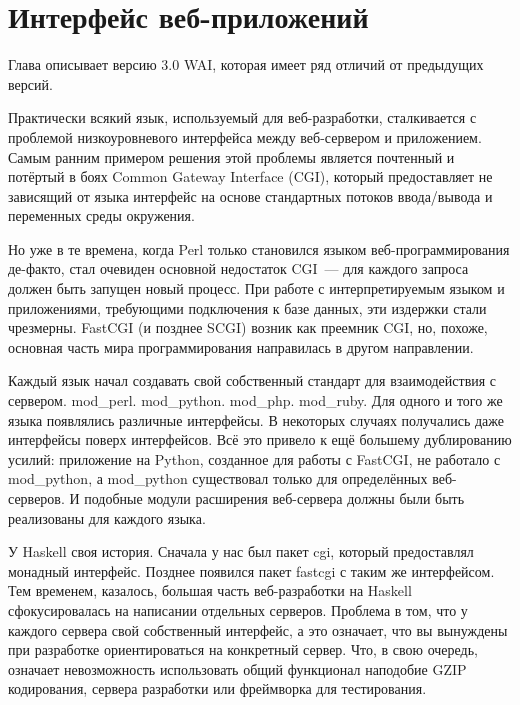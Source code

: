 \chapter{Интерфейс веб-приложений}\label{chap:web_application_interface}

\begin{remark}
    Глава описывает версию 3.0 WAI, которая имеет ряд отличий от предыдущих
    версий.
\end{remark}

Практически всякий язык, используемый для веб-разработки, сталкивается с
проблемой низкоуровневого интерфейса между веб-сервером и приложением. Самым
ранним примером решения этой проблемы является почтенный и потёртый в боях
Common Gateway Interface (CGI), который предоставляет не зависящий от языка
интерфейс на основе стандартных потоков ввода/вывода и переменных среды
окружения.

Но уже в те времена, когда Perl только становился языком веб-программирования
де-факто, стал очевиден основной недостаток CGI~--- для каждого запроса должен
быть запущен новый процесс. При работе с интерпретируемым языком и
приложениями, требующими подключения к базе данных, эти издержки стали
чрезмерны. FastCGI (и позднее SCGI) возник как преемник CGI, но, похоже,
основная часть мира программирования направилась в другом направлении.

Каждый язык начал создавать свой собственный стандарт для взаимодействия с
сервером.  mod\_perl. mod\_python. mod\_php. mod\_ruby. Для одного и того же
языка появлялись различные интерфейсы. В некоторых случаях получались даже
интерфейсы поверх интерфейсов.  Всё это привело к ещё большему дублированию
усилий: приложение на Python, созданное для работы с FastCGI, не работало с
mod\_python, а mod\_python существовал только для определённых веб-серверов. И
подобные модули расширения веб-сервера должны были быть реализованы для каждого
языка.

У Haskell своя история. Сначала у нас был пакет cgi, который предоставлял
монадный интерфейс. Позднее появился пакет fastcgi с таким же интерфейсом.  Тем
временем, казалось, большая часть веб-разработки на Haskell сфокусировалась на
написании отдельных серверов.  Проблема в том, что у каждого сервера свой
собственный интерфейс, а это означает, что вы вынуждены при разработке
ориентироваться на конкретный сервер. Что, в свою очередь, означает
невозможность использовать общий функционал наподобие GZIP кодирования, сервера
разработки или фреймворка для тестирования.

